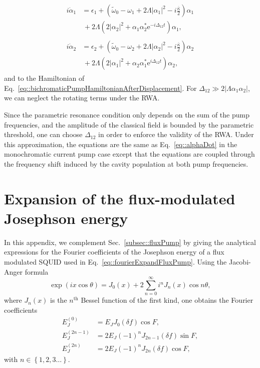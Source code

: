 \documentclass[pra,twocolumn,superscriptaddress]{revtex4-1}
\newcommand{\df}[0]{\delta\!f}
\newcommand{\kappaTot}[0]{\overline{\kappa}}
\newcommand{\parO}[1]{\left(#1\right)}
\newcommand{\parC}[1]{\left\{#1\right\}}
\newcommand{\abs}[1]{\left|#1\right|}
\newcommand{\erm}[0]{\mathrm{e}}
\begin{document}
\begin{align}
\begin{split}
	i\dot {\alpha}_1
	&=
	\epsilon_1 
	+
	\parO{ 
	\tilde{\omega}_0 - \omega_1
	+ 2 \Lambda \abs{\alpha_1  }^2
	-i \frac{\kappaTot}{2}
	}\alpha_1
	\\
	&\,+ 2 \Lambda \parO{
		2\abs{\alpha_2 }^2
		+
		\alpha_1 \alpha_2^* \erm^{-i \Delta_{12}t}
	}\alpha_1,
\end{split}
\\
\begin{split}
	i\dot {\alpha}_2
	&=
	\epsilon_2
	+
	\parO{ 
	\tilde{\omega}_0 - \omega_2
	+ 2 \Lambda \abs{\alpha_2  }^2
	-i \frac{\kappaTot}{2}
	}\alpha_2
	\\
	&\,+ 2 \Lambda \parO{
		2\abs{\alpha_1 }^2
		+
		\alpha_2 \alpha_1^* \erm^{i \Delta_{12}t}
	}\alpha_2,
\end{split}
\end{align}
% 
and to the Hamiltonian of Eq.~\eqref{eq::bichromaticPumpHamiltonianAfterDisplacement}.
% 
For $\Delta_{12}  \gg 2 \abs{ \Lambda \alpha_1 \alpha_2}$, we can neglect the rotating terms under the RWA. 

Since the parametric resonance condition only depends on the sum of the pump frequencies, and the amplitude of the classical field is bounded by the parametric threshold, one can choose $\Delta_{12}$ in order to enforce the validity of the RWA. 
% 
Under this approximation, the equations are the same as Eq.~\eqref{eq::alphaDot} in the monochromatic current pump case except that the equations are coupled through the frequency shift induced by the cavity population at both pump frequencies.


\section{Expansion of the flux-modulated Josephson energy}\label{app::fluxPumpCoeff}
% 
In this appendix, we complement Sec.~\ref{subsec::fluxPump} by giving the analytical expressions for the Fourier coefficients of the Josephson energy of a flux modulated SQUID used in Eq.~\eqref{eq::fourierExpandFluxPump}.
% 
Using the Jacobi-Anger formula~\cite{Arfken:2005fk}
\begin{equation}
	\exp\parO{
	 i x \cos \theta
	}
	= J_0(x) + 2 \sum_{n=0}^{\infty} i^n J_n(x) \cos n \theta,
\end{equation}
where $J_n(x)$ is the $n^{\mathrm{th}}$ Bessel function of the first kind, one obtains the Fourier coefficients
\begin{align}
	E_J^{(0)} &= E_J J_0(\df) \cos F
	,\\
	E_J^{(2n-1)} &= 2 E_J (-1)^n  J_{2n-1}(\df) \sin F
	,\\
	E_J^{(2n)} &= 2E_J (-1)^n  J_{2n}(\df) \cos F
	,
\end{align}
with $n \in \parC{1,2,3 \dots}$.
	
\end{document}
